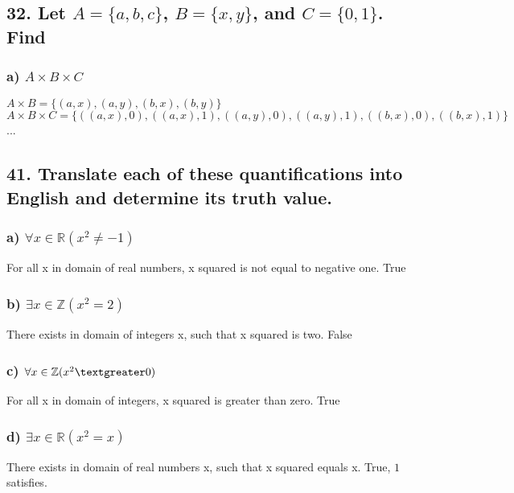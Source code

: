 \documentclass[11pt, oneside]{article} %
\numberwithin{equation}{section} %
\numberwithin{figure}{section} %
\numberwithin{table}{section} %
\begin{document}
\subsection{32. Let $A = \{a,b,c\}$, $B = \{x,y\}$, and $C = \{0,1\}$. Find}
\subsubsection{a) $A \times B \times C$}
$A \times B = \{ (a, x), (a, y), (b, x), (b, y) \}$ \\
$A \times B \times C = \{ ((a, x), 0), ((a, x), 1), ((a, y), 0), ((a, y), 1), ((b, x), 0), ((b, x), 1) \}$\\
...

\subsection{41. Translate each of these quantifications into English and determine its truth value.}
\subsubsection{a) $\forall x \in \mathbb{R} (x^2 \neq -1)$}
For all x in domain of real numbers, x squared is not equal to negative one. True
\subsubsection{b) $\exists x \in \mathbb{Z} (x^2 = 2)$}
There exists in domain of integers x, such that x squared is two. False
\subsubsection{c) $\forall x \in \mathbb{Z} (x^2 \textgreater 0)$}
For all x in domain of integers, x squared is greater than zero. True
\subsubsection{d) $\exists x \in \mathbb{R} (x^2 = x)$}
There exists in domain of real numbers x, such that x squared equals x. True, $1$ satisfies.

\section{}
\end{document}
